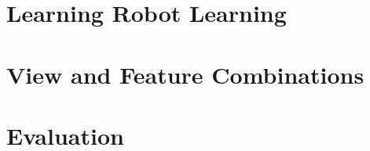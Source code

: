 \appendix

\chapter{Learning Robot Learning}


\chapter{View and Feature Combinations}



\chapter{Evaluation}
% 